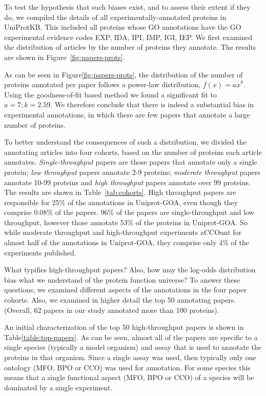 \documentclass[12pt]{article}
\begin{document}
To test the hypothesis that such biases exist, and to assess their extent if they
do, we compiled the details of all experimentally-annotated
proteins in UniProtKB. This included all proteins whose GO annotations have
the GO experimental evidence codes EXP, IDA, IPI, IMP, IGI, IEP. We first examined
the distribution of articles by the number of proteins they annotate. The results
are shown in Figure~\ref{fig:papers-prots}. 

As can be seen in Figure\ref{fig:papers-prots}, the distribution of the number of proteins
annotated per paper follows a power-law distribution, $f(x)=a\dot x^k$. 
Using the goodness-of-fit based
method we found a significant fit to $a=7; k=2.59$. 
We therefore conclude that there is indeed a substantial bias in
experimental annotations, in which there are few papers that annotate a large
number of proteins.

To better understand the consequences of such a distribution, we divided the annotating
articles into four cohorts, based on the number of proteins each article annotates.
\textit{Single-throughput} papers are those papers that annotate only a single protein;
\textit{low throughput} papers annotate 2-9 proteins; \textit{moderate throughput} papers
annotate 10-99 proteins and \textit{high throughput} papers annotate over 99 proteins. The
results are shown in Table~\ref{tab:cohorts}. High throughput papers are responsible for
25\% of the annotations in Uniprot-GOA, even though they comprise 0.08\% of the papers. 96\%
of the papers are single-throughput and low throughput, however those annotate 53\% of the
proteins in Uniprot-GOA. So while moderate throughput and high-throughput experiments
aCCOunt for almost half of the annotations in Uniprot-GOA, they comprise only 4\% of the experiments published.

What typifies high-throughput papers? Also, how may the log-odds distribution bias what we
understand of the protein function universe? To answer these questions, we examined
different aspects of the annotations in the four paper cohorts. Also, we examined in higher
detail the top 50 annotating papers. (Overall, 62 papers in our study annotated more than
100 proteins). 

An initial characterization of the top 50 high-throughput papers is shown in
Table\ref{table:top-papers}.  As can be seen, almost all of the papers are specific to a
single species (typically a model organism) and assay that is used to annotate the proteins
in that organism.  Since a single assay was used, then typically only one ontology (MFO, BPO
or CCO) was used for annotation. For some species this means that a single functional aspect
(MFO, BPO or CCO) of a species will be dominated by a single experiment.
\end{document}
